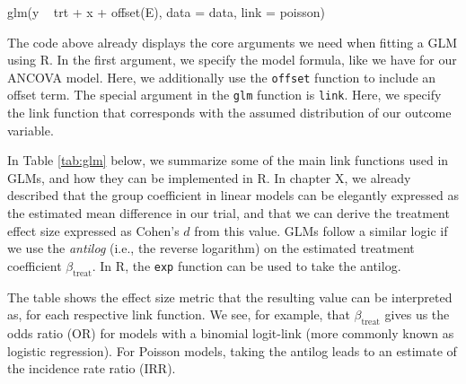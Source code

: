\begin{example}
          glm(y ~ trt + x + offset(E), data = data, link = poisson)
\end{example}

The code above already displays the core arguments we need when fitting a GLM using \textsf{R}. In the first argument, we specify the model formula, like we have for our ANCOVA model. Here, we additionally use the \texttt{offset} function to include an offset term. The special argument in the \texttt{glm} function is \texttt{link}. Here, we specify the link function that corresponds with the assumed distribution of our outcome variable.

In Table \ref{tab:glm} below, we summarize some of the main link functions used in GLMs, and how they can be implemented in \textsf{R}. In chapter X, we already described that the group coefficient in linear models can be elegantly expressed as the estimated mean difference in our trial, and that we can derive the treatment effect size expressed as Cohen's $d$ from this value. GLMs follow a similar logic if we use the \emph{antilog} (i.e., the reverse logarithm) on the estimated treatment coefficient $\beta_{\text{treat}}$. In \textsf{R}, the \texttt{exp} function can be used to take the antilog. 

The table shows the effect size metric that the resulting value can be interpreted as, for each respective link function. We see, for example, that $\beta_{\text{treat}}$ gives us the odds ratio (OR) for models with a binomial logit-link (more commonly known as logistic regression). For Poisson models, taking the antilog leads to an estimate of the incidence rate ratio (IRR). 

